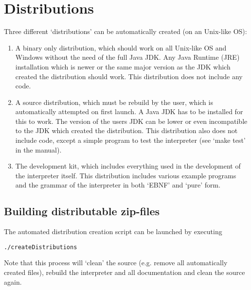 \section{Distributions}

Three different `distributions' can be automatically created (on an Unix-like OS):

\begin{enumerate}
	\item A binary only distribution, which should work on all Unix-like OS and Windows without the need of the full Java JDK. Any Java Runtime (JRE) installation which is newer or the same major version as the JDK which created the distribution should work. This distribution does not include any \SetlX{} code.

	\item A source distribution, which must be rebuild by the user, which is automatically attempted on first launch. A Java JDK has to be installed for this to work. The version of the users JDK can be lower or even incompatible to the JDK which created the distribution. This distribution also does not include \SetlX{} code, except a simple program to test the interpreter (see `make test' in the manual).

	\item The development kit, which includes everything used in the development of the interpreter itself. This distribution includes various \SetlX{} example programs and the grammar of the interpreter in both `EBNF' and `pure' form.
\end{enumerate}

\subsection{Building distributable zip-files}

The automated distribution creation script can be launched by executing

\begin{lstlisting}
./createDistributions
\end{lstlisting}

Note that this process will `clean' the source (e.g. remove all automatically created files), rebuild the interpreter and all documentation and clean the source again.


